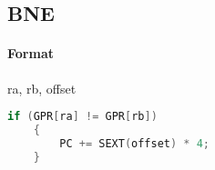 \subsection{BNE}


\paragraph{Format} ra, rb, offset

\begin{lstlisting}[language=c]
    if (GPR[ra] != GPR[rb])
    {
        PC += SEXT(offset) * 4;
    }
\end{lstlisting}
